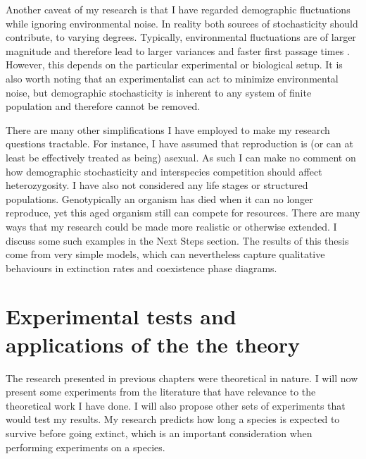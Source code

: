 Another caveat of my research is that I have regarded demographic fluctuations while ignoring environmental noise. 
In reality both sources of stochasticity should contribute, to varying degrees. 
Typically, environmental fluctuations are of larger magnitude and therefore lead to larger variances and faster first passage times \cite{Ovaskainen2010}. 
However, this depends on the particular experimental or biological setup. 
It is also worth noting that an experimentalist can act to minimize environmental noise, but demographic stochasticity is inherent to any system of finite population and therefore cannot be removed. 

There are many other simplifications I have employed to make my research questions tractable. 
For instance, I have assumed that reproduction is (or can at least be effectively treated as being) asexual. 
As such I can make no comment on how demographic stochasticity and interspecies competition should affect heterozygosity. 
I have also not considered any life stages or structured populations. 
Genotypically an organism has died when it can no longer reproduce, yet this aged organism still can compete for resources. 
There are many ways that my research could be made more realistic or otherwise extended. 
I discuss some such examples in the Next Steps section. 
The results of this thesis come from very simple models, which can nevertheless capture qualitative behaviours in extinction rates and coexistence phase diagrams. 


\section{Experimental tests and applications of the the theory}

The research presented in previous chapters were theoretical in nature. 
I will now present some experiments from the literature that have relevance to the theoretical work I have done. 
I will also propose other sets of experiments that would test my results. 
My research predicts how long a species is expected to survive before going extinct, which is an important consideration when performing experiments on a species. 

